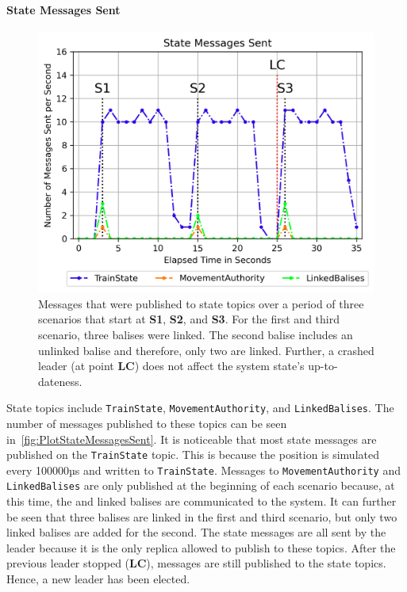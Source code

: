 \paragraph{State Messages Sent}

\begin{figure}[!htb]
	\centering
	\includegraphics[width=0.8\linewidth]{images/plots/StateMessagesSent}
	\caption{Messages that were published to state topics over a period of three scenarios that start at \textbf{S1}, \textbf{S2}, and \textbf{S3}. For the first and third scenario, three balises were linked. The second balise includes an unlinked balise and therefore, only two are linked. Further, a crashed leader (at point \textbf{LC}) does not affect the system state's up-to-dateness.}
	\label{fig:PlotStateMessagesSent}
\end{figure}

State topics include \texttt{TrainState}, \texttt{MovementAuthority}, and \texttt{LinkedBalises}.
The number of messages published to these topics can be seen in~\autoref{fig:PlotStateMessagesSent}.
It is noticeable that most state messages are published on the \texttt{TrainState} topic.
This is because the position is simulated every 100000µs and written to \texttt{TrainState}.
Messages to \texttt{MovementAuthority} and \texttt{LinkedBalises} are only published at the beginning of each scenario because, at this time, the  and linked balises are communicated to the system.
It can further be seen that three balises are linked in the first and third scenario, but only two linked balises are added for the second.
The state messages are all sent by the leader because it is the only replica allowed to publish to these topics.
After the previous leader stopped (\textbf{LC}), messages are still published to the state topics.
Hence, a new leader has been elected.


